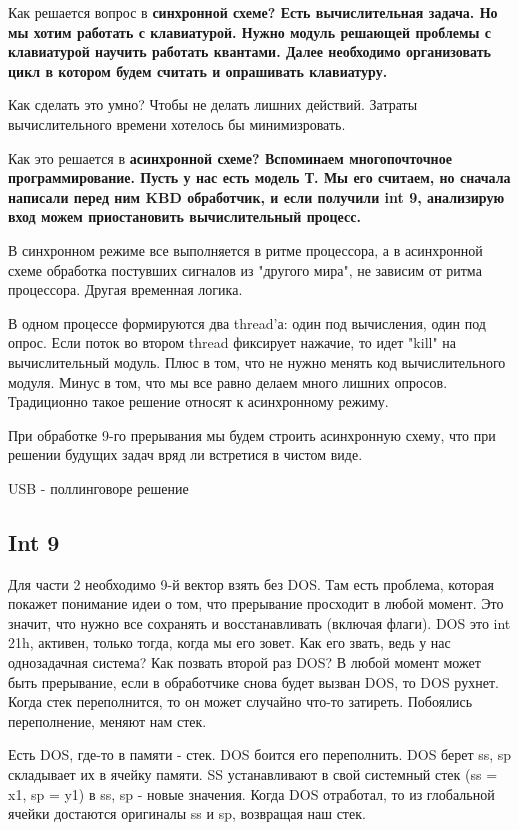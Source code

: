 Как решается вопрос в \bfseries синхронной \mdseries схеме?
Есть вычислительная задача. Но мы хотим работать с клавиатурой. Нужно модуль решающей проблемы с клавиатурой научить работать квантами. Далее необходимо организовать цикл в котором будем считать и опрашивать клавиатуру. 

Как сделать это умно? Чтобы не делать лишних действий. Затраты вычислительного времени хотелось бы минимизровать.

Как это решается в \bfseries асинхронной \mdseries схеме? Вспоминаем многопочточное программирование. Пусть у нас есть модель Т. Мы его считаем, но сначала написали перед ним KBD обработчик, и если получили int 9, анализирую вход  можем приостановить вычислительный процесс.

В синхронном режиме все выполняется в ритме процессора, а в асинхронной схеме обработка постувших сигналов из "другого мира", не зависим от ритма процессора. Другая временная логика. 

В одном процессе формируются два thread'а: один под вычисления, один под опрос. Если поток во втором thread фиксирует нажачие, то идет "kill" на вычислительный модуль. Плюс в том, что не нужно менять код вычислительного модуля. Минус в том, что мы все равно делаем много лишних опросов. Традиционно такое решение относят к асинхронному режиму. 

При обработке 9-го прерывания мы будем строить асинхронную схему, что при решении будущих задач вряд ли встретися в чистом виде. 

\begin{off} USB - поллинговоре решение \end{off}

\subsection{Int 9}
Для части 2 необходимо 9-й вектор взять без DOS. Там есть проблема, которая покажет понимание идеи о том, что прерывание просходит в любой момент. Это значит, что нужно все сохранять и восстанавливать (включая флаги).  DOS это int 21h, активен, только тогда, когда мы его зовет. Как его звать, ведь у нас однозадачная система? Как позвать второй раз DOS? В любой момент может быть прерывание, если в обработчике снова будет вызван DOS, то DOS рухнет. Когда стек переполнится, то он может случайно что-то затиреть. Побоялись переполнение, меняют нам стек.

Есть DOS, где-то в памяти - стек. DOS боится его переполнить. DOS берет ss, sp складывает их в ячейку памяти. SS устанавливают в свой системный стек (ss = x1, sp = y1) в ss, sp - новые значения. Когда DOS отработал, то из глобальной ячейки достаются оригиналы ss и sp, возвращая наш стек.

